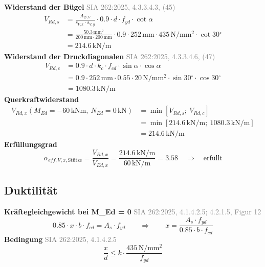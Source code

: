 \documentclass[11pt,a4paper]{article}
\newcommand{\normref}[1]{{\small\textcolor{gray}{#1}}}
\begin{document}
\noindent\textbf{Widerstand der Bügel} \hfill \normref{SIA 262:2025, 4.3.3.4.3, (45)}
\begin{equation*}
\begin{aligned}
  V_{Rd,s} &= \frac{A_{\varnothing,V}}{s_{V,x} \cdot s_{V,y}} \cdot 0.9 \cdot d \cdot f_{yd} \cdot \cot \alpha \\
  &= \frac{50.3\,\mathrm{mm}^{2}}{200\,\mathrm{mm} \cdot 200\,\mathrm{mm}} \cdot 0.9 \cdot 252\,\mathrm{mm} \cdot 435\,\mathrm{N}/\mathrm{mm}^{2} \cdot \cot 30{}^{\circ} \\
  &= 214.6\,\mathrm{kN}/\mathrm{m}
\end{aligned}
\end{equation*}
\noindent\textbf{Widerstand der Druckdiagonalen} \hfill \normref{SIA 262:2025, 4.3.3.4.6, (47)}
\begin{equation*}
\begin{aligned}
  V_{Rd,c} &= 0.9 \cdot d \cdot k_c \cdot f_{cd} \cdot \sin \alpha \cdot \cos \alpha \\
  &= 0.9 \cdot 252\,\mathrm{mm} \cdot 0.55 \cdot 20\,\mathrm{N}/\mathrm{mm}^{2} \cdot \sin 30{}^{\circ} \cdot \cos 30{}^{\circ} \\
  &= 1080.3\,\mathrm{kN}/\mathrm{m}
\end{aligned}
\end{equation*}
\noindent\textbf{Querkraftwiderstand}
\begin{equation*}
\begin{aligned}
  V_{Rd,x}(M_{Ed} = -60\,\mathrm{kNm},\ N_{Ed} = 0\,\mathrm{kN}) &= \min\left[V_{Rd,s};\ V_{Rd,c}\right] \\
  &= \min\left[214.6\,\mathrm{kN}/\mathrm{m};\ 1080.3\,\mathrm{kN}/\mathrm{m}\right] \\
  &= 214.6\,\mathrm{kN}/\mathrm{m}
\end{aligned}
\end{equation*}
\noindent\textbf{Erfüllungsgrad}
\begin{equation*}
\alpha_{eff,V,x,\text{Stütze}} = \frac{V_{Rd,x}}{V_{Ed,x}} = \frac{214.6\,\mathrm{kN}/\mathrm{m}}{60\,\mathrm{kN}/\mathrm{m}} = 3.58 \quad \Rightarrow \quad \text{erfüllt}
\end{equation*}
\subsection{Duktilität}
\noindent\textbf{Kräftegleichgewicht bei M\_Ed = 0} \hfill \normref{SIA 262:2025, 4.1.4.2.5; 4.2.1.5, Figur 12}
\begin{equation*}
0.85 \cdot x \cdot b \cdot f_{cd} = A_s \cdot f_{yd} \qquad \Rightarrow \qquad x = \frac{A_s \cdot f_{yd}}{0.85 \cdot b \cdot f_{cd}}
\end{equation*}
\noindent\textbf{Bedingung} \hfill \normref{SIA 262:2025, 4.1.4.2.5}
\begin{equation*}
\frac{x}{d} \le k \cdot \frac{435\,\mathrm{N/mm^2}}{f_{yd}}
\end{equation*}
\end{document}
